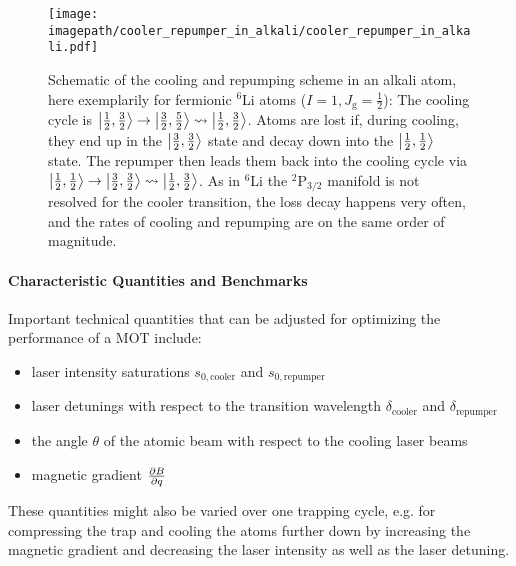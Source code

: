 \begin{figure}
    \centering
    \texttt{[image: \\imagepath/cooler\_repumper\_in\_alkali/cooler\_repumper\_in\_alkali.pdf]}
    \caption{Schematic of the cooling and repumping scheme in an alkali atom, here exemplarily for fermionic $^6$Li atoms ($I = 1, J_\text{g} = \frac{1}{2}$): The cooling cycle is $\Ket{\frac{1}{2}, \frac{3}{2}} \rightarrow \Ket{\frac{3}{2}, \frac{5}{2}} \rightsquigarrow \Ket{\frac{1}{2}, \frac{3}{2}}$. Atoms are lost if, during cooling, they end up in the $\Ket{\frac{3}{2}, \frac{3}{2}}$ state and decay down into the $\Ket{\frac{1}{2}, \frac{1}{2}}$ state. The repumper then leads them back into the cooling cycle via $\Ket{\frac{1}{2}, \frac{1}{2}} \rightarrow \Ket{\frac{3}{2}, \frac{3}{2}} \rightsquigarrow \Ket{\frac{1}{2}, \frac{3}{2}}$. As in $^6$Li the $^2\text{P}_{3/2}$ manifold is not resolved for the cooler transition, the loss decay happens very often, and the rates of cooling and repumping are on the same order of magnitude.}
    \label{fig:cooler_repumper_in_alkali}
\end{figure}

\paragraph{Characteristic Quantities and Benchmarks}
Important technical quantities that can be adjusted for optimizing the performance of a MOT include:
\begin{itemize}
    \item laser intensity saturations $s_{0, \text{cooler}}$ and $s_{0, \text{repumper}}$
    \item laser detunings with respect to the transition wavelength $\delta_\text{cooler}$ and $\delta_\text{repumper}$
    \item the angle $\theta$ of the atomic beam with respect to the cooling laser beams
    \item magnetic gradient $\pdv{B}{q}$
\end{itemize}

These quantities might also be varied over one trapping cycle, e.g. for compressing the trap and cooling the atoms further down by increasing the magnetic gradient and decreasing the laser intensity as well as the laser detuning.

